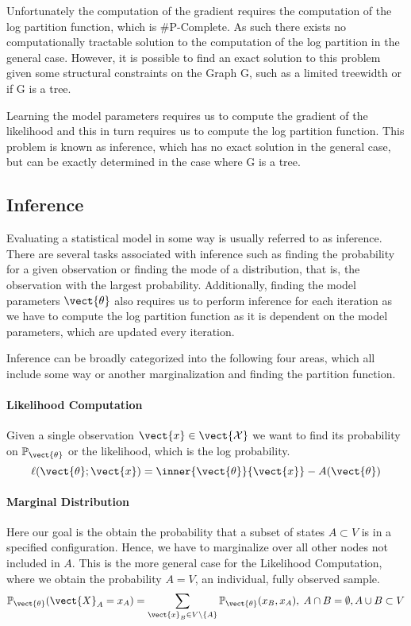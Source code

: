    Unfortunately the computation of the gradient requires the computation of the log partition function, which is \#P-Complete.
    As such there exists no computationally tractable solution to the computation of the log partition in the general case.
    However, it is possible to find an exact solution to this problem given some structural constraints on the Graph G, such as a limited treewidth or if G is a tree.

    Learning the model parameters requires us to compute the gradient of the likelihood and this in turn requires us to compute the log partition function. 
    This problem is known as inference, which has no exact solution in the general case, but can be exactly determined in the case where G is a tree.


\subsection{Inference}
\label{ssec:inf}
Evaluating a statistical model in some way is usually referred to as inference.
There are several tasks associated with inference such as finding the probability for a given observation or finding the mode of a distribution, that is, the observation with the largest probability.
Additionally, finding the model parameters $\vect{\theta}$ also requires us to perform inference for each iteration as we have to compute the log partition function as it is dependent on the model parameters, which are updated every iteration.

Inference can be broadly categorized into the following four areas, which all include some way or another marginalization and finding the partition function.

\paragraph*{Likelihood Computation}
Given a single observation $\vect{x} \in \vect{\mathcal{X}}$ we want to find its probability on $\mathbb{P}_{\vect{\theta}}$ or the likelihood, which is the log probability.
\begin{equation}
    \ell(\vect{\theta}; \vect{x}) = \inner{\vect{\theta}}{\vect{x}} - A(\vect{\theta})
\end{equation}

\paragraph*{Marginal Distribution}
Here our goal is the obtain the probability that a subset of states $A \subset V$ is in a specified configuration.
Hence, we have to marginalize over all other nodes not included in $A$. 
This is the more general case for the Likelihood Computation, where we obtain the probability $A = V$, an individual, fully observed sample.
    \begin{equation}
        \mathbb{P}_{\vect{\theta}}(\vect{X}_A = x_A) = \sum_{\vect{x}_B \in V \setminus\{A\}} \mathbb{P}_{\vect{\theta}}(x_B , x_A), \; A \cap B = \emptyset, A \cup B \subset V
    \end{equation}

